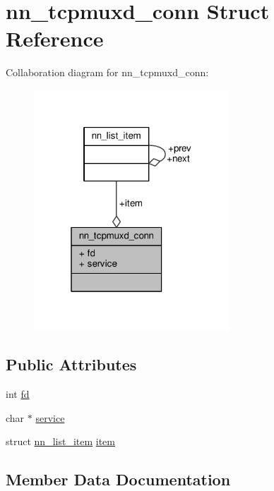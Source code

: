 \hypertarget{structnn__tcpmuxd__conn}{}\section{nn\+\_\+tcpmuxd\+\_\+conn Struct Reference}
\label{structnn__tcpmuxd__conn}


Collaboration diagram for nn\+\_\+tcpmuxd\+\_\+conn\+:\nopagebreak
\begin{figure}[H]
\begin{center}
\leavevmode
\includegraphics[width=208pt]{structnn__tcpmuxd__conn__coll__graph}
\end{center}
\end{figure}
\subsection*{Public Attributes}
\begin{DoxyCompactItemize}
\item 
int \hyperlink{structnn__tcpmuxd__conn_a67ce1fec41d416d7d2745e5c6adcfdbd}{fd}
\item 
char $\ast$ \hyperlink{structnn__tcpmuxd__conn_a94fa92e87e6ef2efa20ca97dc5f66052}{service}
\item 
struct \hyperlink{structnn__list__item}{nn\+\_\+list\+\_\+item} \hyperlink{structnn__tcpmuxd__conn_a8bef328043430d10ea02a12d4b91b095}{item}
\end{DoxyCompactItemize}


\subsection{Member Data Documentation}
